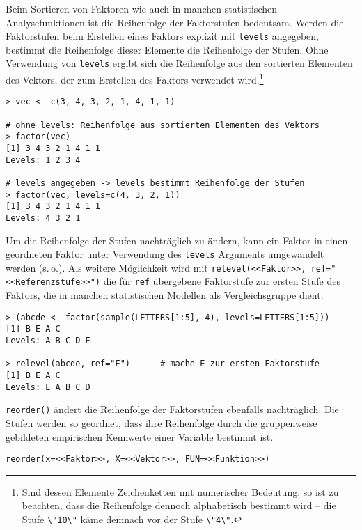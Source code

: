 Beim Sortieren von Faktoren wie auch in manchen statistischen Analysefunktionen ist die Reihenfolge der Faktorstufen bedeutsam. Werden die Faktorstufen beim Erstellen eines Faktors explizit mit \lstinline!levels! angegeben, bestimmt die Reihenfolge dieser Elemente die Reihenfolge der Stufen. Ohne Verwendung von \lstinline!levels! ergibt sich die Reihenfolge aus den sortierten Elementen des Vektors, der zum Erstellen des Faktors verwendet wird.\footnote{Sind dessen Elemente Zeichenketten mit numerischer Bedeutung, so ist zu beachten, dass die Reihenfolge dennoch alphabetisch bestimmt wird -- die Stufe \lstinline!\"10\"! käme demnach vor der Stufe \lstinline!\"4\"!.}
\begin{lstlisting}
> vec <- c(3, 4, 3, 2, 1, 4, 1, 1)

# ohne levels: Reihenfolge aus sortierten Elementen des Vektors
> factor(vec)
[1] 3 4 3 2 1 4 1 1
Levels: 1 2 3 4

# levels angegeben -> levels bestimmt Reihenfolge der Stufen
> factor(vec, levels=c(4, 3, 2, 1))
[1] 3 4 3 2 1 4 1 1
Levels: 4 3 2 1
\end{lstlisting}

Um die Reihenfolge der Stufen nachträglich zu ändern, kann ein Faktor in einen geordneten Faktor unter Verwendung des \lstinline!levels! Arguments umgewandelt werden (s.\,o.). Als weitere Möglichkeit wird mit \lstinline!relevel(<<Faktor>>, ref="<<Referenzstufe>>")! die für \lstinline!ref! übergebene Faktorstufe zur ersten Stufe des Faktors, die in manchen statistischen Modellen als Vergleichsgruppe dient.
\begin{lstlisting}
> (abcde <- factor(sample(LETTERS[1:5], 4), levels=LETTERS[1:5]))
[1] B E A C
Levels: A B C D E

> relevel(abcde, ref="E")      # mache E zur ersten Faktorstufe
[1] B E A C
Levels: E A B C D
\end{lstlisting}
     
\lstinline!reorder()! ändert die Reihenfolge der Faktorstufen ebenfalls nachträglich. Die Stufen werden so geordnet, dass ihre Reihenfolge durch die gruppenweise gebildeten empirischen Kennwerte einer Variable bestimmt ist. 
\begin{lstlisting}
reorder(x=<<Faktor>>, X=<<Vektor>>, FUN=<<Funktion>>)
\end{lstlisting}

